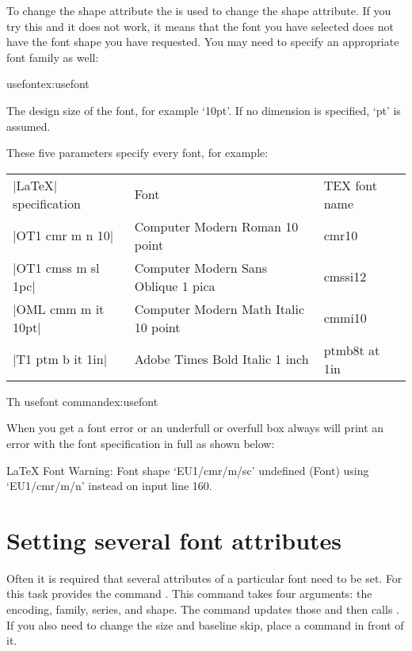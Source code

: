 \begin{description}
To change the shape attribute the  is used to change the shape
attribute. If you try this and it does not work, it means that the font you have selected
does not have the font shape you have requested. You may need to specify an appropriate
font family as well:

\begin{texexample}{usefont}{ex:usefont}
{  \raggedright \lorem}
\end{texexample}

\item[size] The design size of the font, for example `10pt'. If no dimension is specified, `pt' is assumed.
\end{description}

These five parameters specify every \latex
font, for example:

\begin{longtable}{lll}
|LaTeX| specification &Font  &TEX font name\\
|OT1 cmr m n 10|      &Computer Modern Roman 10 point &cmr10\\
|OT1 cmss m sl 1pc|   &Computer Modern Sans Oblique 1 pica &cmssi12\\
|OML cmm m it 10pt|   &Computer Modern Math Italic 10 point &cmmi10\\
|T1 ptm b it 1in|  &Adobe Times Bold Italic 1 inch &ptmb8t at 1in\\
\end{longtable}

\begin{texexample}{Th usefont command}{ex:usefont}
\bgroup
\fontsize{12}{14pt} \lorem
\lorem
\egroup
\end{texexample}

When you get a font error or an underfull or overfull box \tex always will print an error with the font specification in full as shown below:

\begin{teX}
LaTeX Font Warning: Font shape `EU1/cmr/m/sc' undefined
(Font)              using `EU1/cmr/m/n' instead on input line 160.
\end{teX}

\section{Setting several font attributes}

Often it is required that several attributes of a particular font need to be set. For this
task \latex provides the command . This command takes four arguments: the encoding, family, series, and shape. The command updates those and then calls . If you also need to change the size and baseline skip, place
a  command in front of it. 


